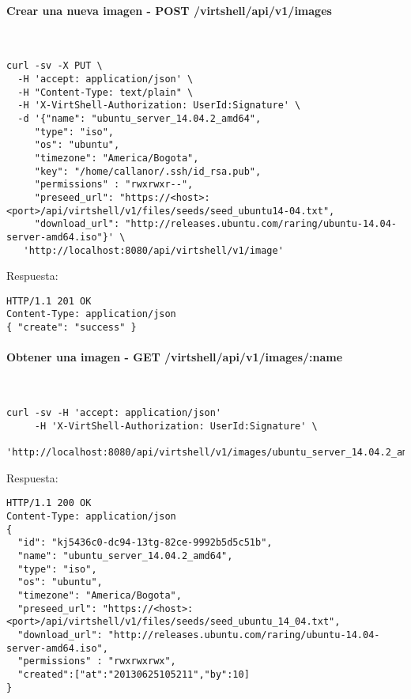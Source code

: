 \paragraph{Crear una nueva imagen - POST /virtshell/api/v1/images} ~\\

\begin{lstlisting}[style=json]
curl -sv -X PUT \
  -H 'accept: application/json' \
  -H "Content-Type: text/plain" \
  -H 'X-VirtShell-Authorization: UserId:Signature' \
  -d '{"name": "ubuntu_server_14.04.2_amd64",
     "type": "iso",
     "os": "ubuntu",
     "timezone": "America/Bogota", 
     "key": "/home/callanor/.ssh/id_rsa.pub",
     "permissions" : "rwxrwxr--",
     "preseed_url": "https://<host>:<port>/api/virtshell/v1/files/seeds/seed_ubuntu14-04.txt",
     "download_url": "http://releases.ubuntu.com/raring/ubuntu-14.04-server-amd64.iso"}' \
   'http://localhost:8080/api/virtshell/v1/image'
\end{lstlisting}

\vspace{1cm}
Respuesta:
\vspace{1cm}

\begin{lstlisting}[style=json]
HTTP/1.1 201 OK
Content-Type: application/json
{ "create": "success" }
\end{lstlisting}

\paragraph{Obtener una imagen - GET /virtshell/api/v1/images/:name} ~\\

\begin{lstlisting}[style=json]
curl -sv -H 'accept: application/json' 
     -H 'X-VirtShell-Authorization: UserId:Signature' \ 
     'http://localhost:8080/api/virtshell/v1/images/ubuntu_server_14.04.2_amd64'
\end{lstlisting}

\vspace{1cm}
Respuesta:
\vspace{1cm}

\begin{lstlisting}[style=json]
HTTP/1.1 200 OK
Content-Type: application/json
{
  "id": "kj5436c0-dc94-13tg-82ce-9992b5d5c51b",
  "name": "ubuntu_server_14.04.2_amd64",
  "type": "iso",
  "os": "ubuntu", 
  "timezone": "America/Bogota", 
  "preseed_url": "https://<host>:<port>/api/virtshell/v1/files/seeds/seed_ubuntu_14_04.txt",
  "download_url": "http://releases.ubuntu.com/raring/ubuntu-14.04-server-amd64.iso",
  "permissions" : "rwxrwxrwx",
  "created":["at":"20130625105211","by":10]
}
\end{lstlisting}

